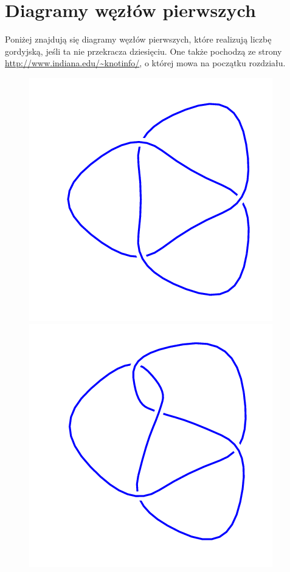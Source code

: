 \section{Diagramy węzłów pierwszych}
\label{sec:table_of_prime_knots}
Poniżej znajdują się diagramy węzłów pierwszych, które realizują liczbę gordyjską, jeśli ta nie przekracza dziesięciu.
One także pochodzą ze strony \url{http://www.indiana.edu/~knotinfo/}, o której mowa na początku rozdziału.

\begin{figure}[H]
	\begin{minipage}[b]{.18\linewidth}
		\centering
		\includegraphics[width=\linewidth]{../data/3_1.png}
	\end{minipage}
	\begin{minipage}[b]{.18\linewidth}
		\centering
		\includegraphics[width=\linewidth]{../data/4_1.png}

\end{minipage}
\end{figure}
